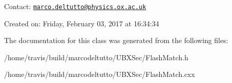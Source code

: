 \-Contact\-: \href{mailto:marco.deltutto@physics.ox.ac.uk}{\tt marco.\-deltutto@physics.\-ox.\-ac.\-uk}

\-Created on\-: \-Friday, \-February 03, 2017 at 16\-:34\-:34 

\-The documentation for this class was generated from the following files\-:\begin{DoxyCompactItemize}
\item 
/home/travis/build/marcodeltutto/\-U\-B\-X\-Sec/\-Flash\-Match.\-h\item 
/home/travis/build/marcodeltutto/\-U\-B\-X\-Sec/\-Flash\-Match.\-cxx\end{DoxyCompactItemize}
